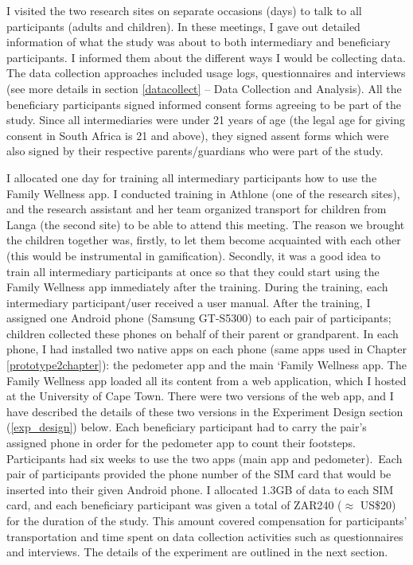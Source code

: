 I visited the two research sites on separate occasions (days) to talk to all participants (adults and children). In these meetings, I gave out detailed information of what the study was about to both intermediary and beneficiary participants. I informed them about the different ways I would be collecting data. The data collection approaches included usage logs, questionnaires and interviews (see more details in section \ref{datacollect} -- Data Collection and Analysis). All the beneficiary participants signed informed consent forms agreeing to be part of the study. Since all intermediaries were under 21 years of age (the legal age for giving consent in South Africa is 21 and above), they signed assent forms which were also signed by their respective parents/guardians who were part of the study.

I allocated one day for training all intermediary participants how to use the Family Wellness app. I conducted training in Athlone (one of the research sites), and the research assistant and her team organized transport for children from Langa (the second site) to be able to attend this meeting. The reason we brought the children together was, firstly, to let them become acquainted with each other (this would be instrumental in gamification). Secondly, it was a good idea to train all intermediary participants at once so that they could start using the Family Wellness app immediately after the training. During the training, each intermediary participant/user received a user manual. After the training, I assigned one Android phone (Samsung GT-S5300) to each pair of participants; children collected these phones on behalf of their parent or grandparent. In each phone, I had installed two native apps on each phone (same apps used in Chapter \ref{prototype2chapter}): the pedometer app and the main `Family Wellness app. The Family Wellness app loaded all its content from a web application, which I hosted at the University of Cape Town. There were two versions of the web app, and I have described the details of these two versions in the Experiment Design section (\ref{exp_design}) below. Each beneficiary participant had to carry the  pair's assigned phone in order for the pedometer app to count their footsteps. Participants had six weeks to use the two apps (main app and pedometer).~Each pair of participants provided the phone number of the SIM card that would be inserted into their given Android phone. I allocated 1.3GB of data to each SIM card, and each beneficiary participant was given a total of ZAR240 ($\approx$ US\$20) for the duration of the study. This amount covered compensation for participants' transportation and time spent on data collection activities such as questionnaires and interviews. The details of the experiment are outlined in the next section. 

